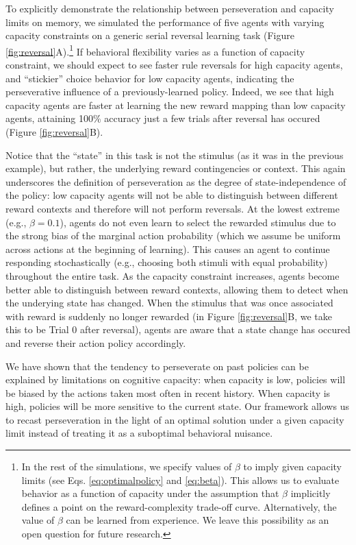 \documentclass[11pt]{article}
\begin{document}
To explicitly demonstrate the relationship between perseveration and capacity limits on memory, we simulated the performance of five agents with varying capacity constraints on a generic serial reversal learning task (Figure \ref{fig:reversal}A).\footnote{In the rest of the simulations, we specify values of $\beta$ to imply given capacity limits (see Eqs. \ref{eq:optimalpolicy} and \ref{eq:beta}). This allows us to evaluate behavior as a function of capacity under the assumption that $\beta$ implicitly defines a point on the reward-complexity trade-off curve. Alternatively, the value of $\beta$ can be learned from experience. We leave this possibility as an open question for future research.} If behavioral flexibility varies as a function of capacity constraint, we should expect to see faster rule reversals for high capacity agents, and ``stickier'' choice behavior for low capacity agents, indicating the perseverative influence of a previously-learned policy. Indeed, we see that high capacity agents are faster at learning the new reward mapping than low capacity agents, attaining 100\% accuracy just a few trials after reversal has occured (Figure \ref{fig:reversal}B).

Notice that the ``state'' in this task is not the stimulus (as it was in the previous example), but rather, the underlying reward contingencies or context. This again underscores the definition of perseveration as the degree of state-independence of the policy: low capacity agents will not be able to distinguish between different reward contexts and therefore will not perform reversals. At the lowest extreme (e.g., $\beta = 0.1$), agents do not even learn to select the rewarded stimulus due to the strong bias of the marginal action probability (which we assume be uniform across actions at the beginning of learning). This causes an agent to continue responding stochastically (e.g., choosing both stimuli with equal probability) throughout the entire task. As the capacity constraint increases, agents become better able to distinguish between reward contexts, allowing them to detect when the underying state has changed. When the stimulus that was once associated with reward is suddenly no longer rewarded (in Figure \ref{fig:reversal}B, we take this to be Trial 0 after reversal), agents are aware that a state change has occured and reverse their action policy accordingly. 

We have shown that the tendency to perseverate on past policies can be explained by limitations on cognitive capacity: when capacity is low, policies will be biased by the actions taken most often in recent history. When capacity is high, policies will be more sensitive to the current state. Our framework allows us to recast perseveration in the light of an optimal solution under a given capacity limit instead of treating it as a suboptimal behavioral nuisance.
\end{document}
